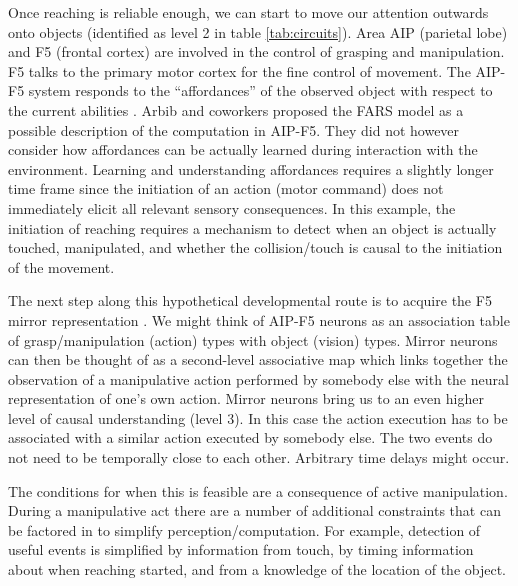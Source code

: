 Once reaching is reliable enough, we can start to move our attention 
outwards onto objects (identified as level 2 in table \ref{tab:circuits}). 
Area AIP (parietal lobe) and F5 (frontal cortex) are involved in the
control of grasping and manipulation. F5 talks to the 
primary motor cortex for the fine control of movement. 
The AIP-F5 system responds to the ``affordances'' of the observed 
object with respect to the current abilities \cite{gibson77theory}.
Arbib and coworkers \cite{fagg-arbib-1998} proposed 
the FARS model as a possible description of the computation in AIP-F5. 
They did not however consider how affordances can be 
actually learned during interaction with the environment. 
Learning and understanding affordances requires a slightly longer 
time frame since the initiation of an action (motor command) does not
immediately elicit all relevant sensory consequences. In this example, the initiation
of reaching requires a mechanism to detect when an object is actually 
touched, manipulated, and whether the collision/touch is causal to the
initiation of the movement.

The next step along this hypothetical developmental route is to 
acquire the F5 mirror representation \cite{gallese-fadiga-fogassi-rizzolatti-1996}. 
We might think of AIP-F5 neurons as
an association table of grasp/manipulation (action) types with object
(vision) types.  Mirror neurons can then be thought of as a 
second-level associative map which links together the observation of 
a manipulative action performed by somebody else with the neural 
representation of one's own action.
Mirror neurons bring us to an even higher level of causal 
understanding (level 3). In this case the action execution has to be associated
with a similar action executed by somebody else. The two events
do not need to be temporally close to each other. Arbitrary time delays
might occur.

The conditions for when this is feasible are a consequence of active
manipulation. During a manipulative act there are a number of
additional constraints that can be factored in to simplify
perception/computation.  For example, detection of useful events is
simplified by information from touch, by timing information 
about when
reaching started, and from a knowledge of the location of the object.%

